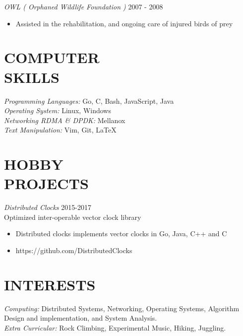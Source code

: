 \documentclass[line,margin]{res}
\begin{document}
\begin{resume}

{\sl OWL ( Orphaned Wildlife Foundation )} {\hfill 2007 - 2008}
    \begin{itemize}
         \item Assisted in the rehabilitation, and ongoing care of injured birds of prey
    \end{itemize}
    

\section{COMPUTER \\ SKILLS} 
	{\sl Programming Languages:} Go, C, Bash, JavaScript, Java\\
	{\sl Operating System:} Linux, Windows\\
	{\sl Networking RDMA \& DPDK:} Mellanox\\
	{\sl Text Manipulation:} Vim, Git, \LaTeX \\

\section{HOBBY \\ PROJECTS}
{\sl Distributed Clocks} \hfill 2015-2017\\
    Optimized inter-operable vector clock library
\begin{itemize} \itemsep -2pt
		\item Distributed clocks implements vector clocks in Go, Java, C++ and C
		\item https://github.com/DistributedClocks
\end{itemize}

\section{INTERESTS}
	{\sl Computing:}  Distributed Systems, Networking, Operating Systems, Algorithm Design and implementation, and System Analysis.\\
	{\sl Extra Curricular:} Rock Climbing, Experimental Music, Hiking, Juggling.\\

\end{resume}
\end{document}
